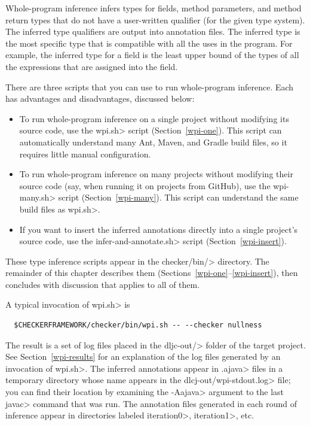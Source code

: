 
Whole-program inference
infers types for fields, method parameters, and method return types that do not
have a user-written qualifier (for the given type system).
The inferred type qualifiers are output into annotation files.
The inferred type is the most specific type that is compatible with all the
uses in the program.  For example, the inferred type for a field is the
least upper bound of the types of all the expressions that are assigned
into the field.

There are three scripts that you can use to run whole-program inference.
Each has advantages and disadvantages, discussed below:

\begin{itemize}
    \item
    To run whole-program inference on a single project without modifying its source code,
    use the \<wpi.sh> script (Section~\ref{wpi-one}). This script can automatically understand
    many Ant, Maven, and Gradle build files, so it requires little manual configuration.

    \item
    To run whole-program inference on many projects without modifying their source code
    (say, when running it on projects from GitHub), use the \<wpi-many.sh> script (Section~\ref{wpi-many}).
    This script can understand the same build files as \<wpi.sh>.

    \item
    If you want to insert the inferred annotations directly into a single
    project's source code, use the \<infer-and-annotate.sh> script (Section~\ref{wpi-insert}).
\end{itemize}

These type inference scripts appear in the \<checker/bin/> directory.
The remainder of this chapter describes them
(Sections~\ref{wpi-one}--\ref{wpi-insert}), then concludes with discussion
that applies to all of them.



A typical invocation of \<wpi.sh> is

\begin{Verbatim}
  $CHECKERFRAMEWORK/checker/bin/wpi.sh -- --checker nullness
\end{Verbatim}

The result is a set of log files placed in the \<dljc-out/> folder of the
target project.
See Section~\ref{wpi-results} for an explanation of the log files generated by
an invocation of \<wpi.sh>.
The inferred annotations appear in \<.ajava> files in a
temporary directory whose name appears in the \<dlcj-out/wpi-stdout.log> file;
you can find their location by examining the \<-Aajava> argument
to the last \<javac> command that was run. The annotation files generated in
each round of inference appear in directories labeled \<iteration0>, \<iteration1>, etc.

